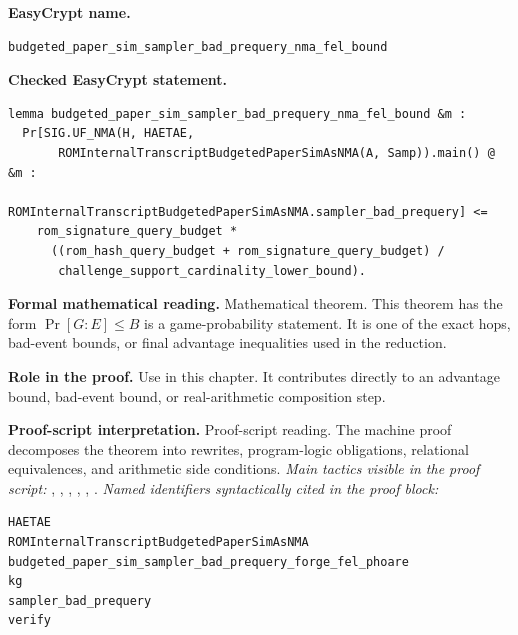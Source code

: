 \begin{formaltheorem}
\noindent\textbf{EasyCrypt name.}
\begin{lstlisting}[language=EasyCrypt,basicstyle=\ttfamily\scriptsize]
budgeted_paper_sim_sampler_bad_prequery_nma_fel_bound
\end{lstlisting}
\noindent\textbf{Checked EasyCrypt statement.}
\begin{lstlisting}[language=EasyCrypt,basicstyle=\ttfamily\scriptsize]
lemma budgeted_paper_sim_sampler_bad_prequery_nma_fel_bound &m :
  Pr[SIG.UF_NMA(H, HAETAE,
       ROMInternalTranscriptBudgetedPaperSimAsNMA(A, Samp)).main() @ &m :
       ROMInternalTranscriptBudgetedPaperSimAsNMA.sampler_bad_prequery] <=
    rom_signature_query_budget *
      ((rom_hash_query_budget + rom_signature_query_budget) /
       challenge_support_cardinality_lower_bound).
\end{lstlisting}
\noindent\textbf{Formal mathematical reading.}
Mathematical theorem. This theorem has the form \(\Pr[G:E] \le B\) is a game-probability statement.  It is one of the exact hops, bad-event bounds, or final advantage inequalities used in the reduction.

\noindent\textbf{Role in the proof.}
Use in this chapter. It contributes directly to an advantage bound, bad-event bound, or real-arithmetic composition step.

\noindent\textbf{Proof-script interpretation.}
Proof-script reading. The machine proof decomposes the theorem into rewrites, program-logic obligations, relational equivalences, and arithmetic side conditions.
\emph{Main tactics visible in the proof script:} , , , , , .
\emph{Named identifiers syntactically cited in the proof block:}
\begin{lstlisting}[language=EasyCrypt,basicstyle=\ttfamily\scriptsize]
HAETAE
ROMInternalTranscriptBudgetedPaperSimAsNMA
budgeted_paper_sim_sampler_bad_prequery_forge_fel_phoare
kg
sampler_bad_prequery
verify
\end{lstlisting}

\end{formaltheorem}

